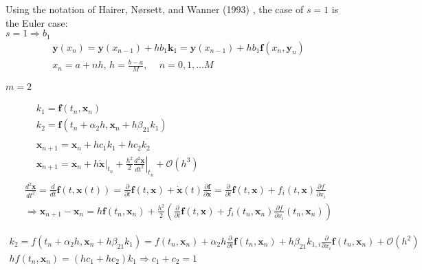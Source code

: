 \documentclass[10pt]{amsart}
\begin{document}
\begin{multicols*}{2}
Using the notation of Hairer, N\o rsett, and Wanner (1993) \cite{HNW1993}, the case of $s=1$ is the Euler case: \\
$s=1 \Longrightarrow b_1$ \\

\[
\begin{gathered}
	\mathbf{y}(x_n) = \mathbf{y}(x_{n-1}) + h b_1 \mathbf{k}_1 = \mathbf{y}(x_{n-1}) + hb_1 \mathbf{f}(x_n, \mathbf{y}_n) \\
	x_n = a +nh, \, h = \frac{b-a}{M}, \quad \, n = 0,1, \dots M
\end{gathered}
\]


$m=2$

\[
\begin{gathered}
	\begin{aligned}
		& k_1 = \mathbf{f}(t_n, \mathbf{x}_n) \\
		& k_2 = \mathbf{f}(t_n + \alpha_2 h, \mathbf{x}_n + h \beta_{21} k_1)
	\end{aligned} \\
\begin{aligned}
	& \mathbf{x}_{n+1} = \mathbf{x}_n + hc_1 k_1 + hc_2 k_2 \\
	& \mathbf{x}_{n+1} = \mathbf{x}_n + h \left. \dot{ \mathbf{x}} \right|_{t_n} + \frac{h^2}{2} \left. \frac{d^2 \mathbf{x}}{ dt^2} \right|_{t_n} + \mathcal{O}(h^3)
\end{aligned} \\
\frac{d^2 \mathbf{x}}{dt^2} = \frac{d}{dt} \mathbf{f}(t, \mathbf{x}(t)) = \frac{\partial}{\partial t} \mathbf{f}(t, \mathbf{x}) + \dot{ \mathbf{x}}(t) \frac{\partial \mathbf{f}}{\partial \mathbf{x}} = \frac{ \partial }{ \partial t} \mathbf{f}(t, \mathbf{x}) + f_i(t,\mathbf{x}) \frac{\partial f}{ \partial x_i} \\
\Longrightarrow \mathbf{x}_{n+1} - \mathbf{x}_n = h \mathbf{f}(t_n , \mathbf{x}_n) + \frac{h^2}{2} \left( \frac{\partial }{ \partial t} \mathbf{f}(t, \mathbf{x}) + f_i(t_n , \mathbf{x}_n) \frac{\partial f}{ \partial x_i}(t_n,\mathbf{x}_n) \right)
\end{gathered}
\]

\[
\begin{gathered}
k_2 = f(t_n+\alpha_2 h, \mathbf{x}_n + h\beta_{21} k_1) = f(t_n,\mathbf{x}_n) + \alpha_2 h \frac{\partial}{\partial t} \mathbf{f}(t_n,\mathbf{x}_n) + h \beta_{21} k_{1, i} \frac{\partial}{\partial x_i} \mathbf{f}(t_n, \mathbf{x}_n) + \mathcal{O}(h^2)	 \\
hf(t_n,\mathbf{x}_n) = (hc_1 + hc_2) k_1 \Longrightarrow c_1 + c_2 = 1 \\
\end{gathered}
\]


\end{multicols*}
\end{document}
